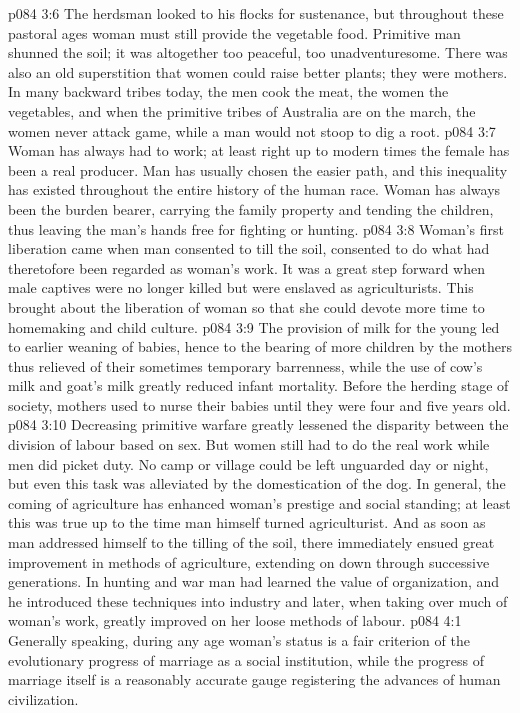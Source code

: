 \vs p084 3:6 \pc The herdsman looked to his flocks for sustenance, but throughout these pastoral ages woman must still provide the vegetable food. Primitive man shunned the soil; it was altogether too peaceful, too unadventuresome. There was also an old superstition that women could raise better plants; they were mothers. In many backward tribes today, the men cook the meat, the women the vegetables, and when the primitive tribes of Australia are on the march, the women never attack game, while a man would not stoop to dig a root.
\vs p084 3:7 Woman has always had to work; at least right up to modern times the female has been a real producer. Man has usually chosen the easier path, and this inequality has existed throughout the entire history of the human race. Woman has always been the burden bearer, carrying the family property and tending the children, thus leaving the man’s hands free for fighting or hunting.
\vs p084 3:8 Woman’s first liberation came when man consented to till the soil, consented to do what had theretofore been regarded as woman’s work. It was a great step forward when male captives were no longer killed but were enslaved as agriculturists. This brought about the liberation of woman so that she could devote more time to homemaking and child culture.
\vs p084 3:9 The provision of milk for the young led to earlier weaning of babies, hence to the bearing of more children by the mothers thus relieved of their sometimes temporary barrenness, while the use of cow’s milk and goat’s milk greatly reduced infant mortality. Before the herding stage of society, mothers used to nurse their babies until they were four and five years old.
\vs p084 3:10 Decreasing primitive warfare greatly lessened the disparity between the division of labour based on sex. But women still had to do the real work while men did picket duty. No camp or village could be left unguarded day or night, but even this task was alleviated by the domestication of the dog. In general, the coming of agriculture has enhanced woman’s prestige and social standing; at least this was true up to the time man himself turned agriculturist. And as soon as man addressed himself to the tilling of the soil, there immediately ensued great improvement in methods of agriculture, extending on down through successive generations. In hunting and war man had learned the value of organization, and he introduced these techniques into industry and later, when taking over much of woman’s work, greatly improved on her loose methods of labour.
\vs p084 4:1 Generally speaking, during any age woman’s status is a fair criterion of the evolutionary progress of marriage as a social institution, while the progress of marriage itself is a reasonably accurate gauge registering the advances of human civilization.
